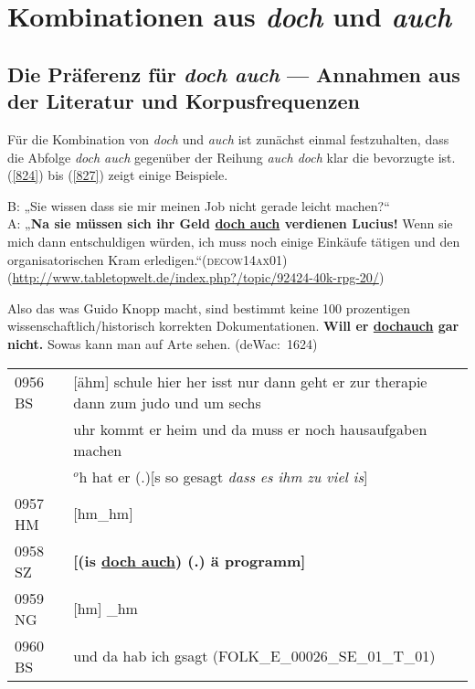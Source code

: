 \chapter{Kombinationen aus \textit{doch} und \textit{auch}}
\label{chapter:dua} 
\section{Die Präferenz für \textit{doch auch} --- Annahmen aus der Literatur und Korpusfrequenzen}
\label{sec:präferenz}
Für die Kombination von \textit{doch} und \textit{auch} ist zunächst einmal festzuhalten, dass die Abfolge \textit{doch auch} gegenüber der Reihung \textit{auch doch} klar die bevorzugte ist. (\ref{824}) bis (\ref{827}) zeigt einige Beispiele.

\begin{exe}
	\ex\label{824} 

	B: „Sie wissen dass sie mir meinen Job nicht gerade leicht machen?“\\
	A: „\textbf{Na sie müssen sich ihr Geld \ul{doch auch} verdienen Lucius!} Wenn sie mich dann entschuldigen würden, 	ich muss noch einige Einkäufe tätigen und den organisatorischen Kram erledigen.“\hfill\hbox{\scshape(decow14ax01)}
	\newline\relax
	{\scriptsize(\url{http://www.tabletopwelt.de/index.php?/topic/92424-40k-rpg-20/})}
\end{exe}

\begin{exe}
	\ex\label{825} 

	Also das was Guido Knopp macht, sind bestimmt keine 100 prozentigen wissenschaftlich\slash historisch korrekten Dokumentationen. \textbf{Will er \ul{doch\linebreak auch} gar nicht.} Sowas kann man auf Arte sehen. 
	\hbox{}\hfill\hbox{(deWac: 1624)}
\end{exe}
	
\begin{exe}
	\ex\label{826} 

    \begin{tabularx}{\linewidth}[t]{@{}lX@{}}
	0956 BS	& [ähm] schule hier her isst nur dann geht er zur therapie dann zum judo und um sechs\\
	{} & uhr kommt er heim und da muss er noch hausaufgaben machen\\
	{} & $^{o}$h hat er (.)[s so gesagt \emph{dass es ihm zu viel is}]\\
	0957 HM & [hm\_hm]\\
	0958 SZ & \hspace{1cm}\textbf{[(is \ul{doch auch}) (.) ä programm]}\\
	0959 NG & [hm] \_hm\\
	0960 BS & und da hab ich gsagt	
	\hfill\hbox{\scshape(FOLK\_E\_00026\_SE\_01\_T\_01)} 					 
    \end{tabularx}   
\end{exe}

